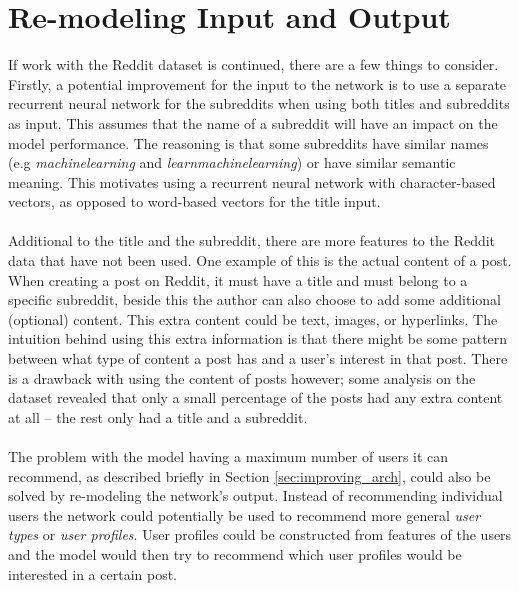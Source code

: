 \section{Re-modeling Input and Output}
If work with the Reddit dataset is continued, there are a few things to consider. Firstly, a potential improvement for the input to the network is to use a separate recurrent neural network for the subreddits when using both titles and subreddits as input. This assumes that the name of a subreddit will have an impact on the model performance. The reasoning is that some subreddits have similar names (e.g \textit{machinelearning} and \textit{learnmachinelearning}) or have similar semantic meaning. This motivates using a recurrent neural network  with character-based vectors, as opposed to word-based vectors for the title input.
\\\\
Additional to the title and the subreddit, there are more features to the Reddit data that have not been used. One example of this is the actual content of a post. When creating a post on Reddit, it must have a title and must belong to a specific subreddit, beside this the author can also choose to add some additional (optional) content. This extra content could be text, images, or hyperlinks. The intuition behind using this extra information is that there might be some pattern between what type of content a post has and a user's interest in that post. There is a drawback with using the content of posts however; some analysis on the dataset revealed that only a small percentage of the posts had any extra content at all -- the rest only had a title and a subreddit.
\\\\
The problem with the model having a maximum number of users it can recommend, as described briefly in Section \ref{sec:improving_arch}, could also be solved by re-modeling the network's output. Instead of recommending individual users the network could potentially be used to recommend more general \textit{user types} or \textit{user profiles}. User profiles could be constructed from features of the users and the model would then try to recommend which user profiles would be interested in a certain post. 